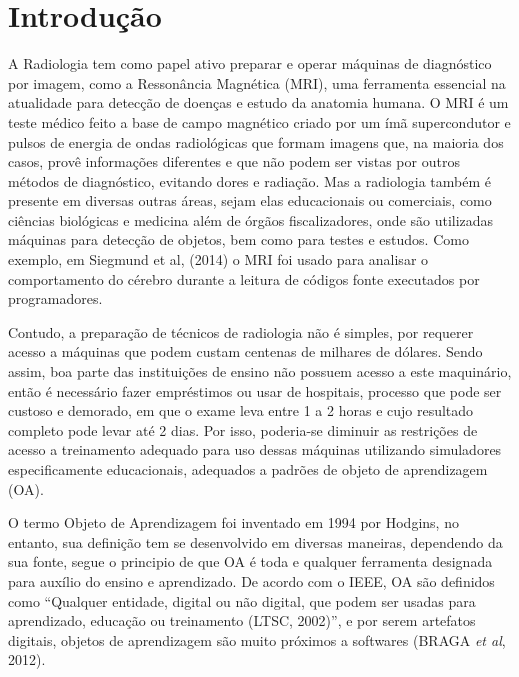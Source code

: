\documentclass[12pt,openright,oneside,a4paper,english,french,spanish,brazil]{unifil}
\begin{document}
\renewcommand{\ABNTEXsectionfont}{\uppercase{\fontfamily{cmr}\fontseries{b}\selectfont}}
\renewcommand{\ABNTEXsectionfontsize}{\large}

\chapter{Introdução}

A Radiologia tem como papel ativo preparar e operar máquinas de diagnóstico por imagem, como a Ressonância Magnética (MRI), uma ferramenta essencial na atualidade para detecção de doenças e estudo da anatomia humana. O MRI é um teste médico feito a base de campo magnético criado por um ímã supercondutor e pulsos de energia de ondas radiológicas que formam imagens que, na maioria dos casos, provê informações diferentes e que não podem ser vistas por outros métodos de diagnóstico, evitando dores e radiação. Mas a radiologia também é presente em diversas outras áreas, sejam elas educacionais ou comerciais, como ciências biológicas e medicina além de órgãos fiscalizadores, onde são utilizadas máquinas para detecção de objetos, bem como para testes e estudos. Como exemplo, em Siegmund et al, (2014) o MRI foi usado para analisar o comportamento do cérebro durante a leitura de códigos fonte executados por programadores. 
\par Contudo, a preparação de técnicos de radiologia não é simples, por requerer acesso a máquinas que podem custam centenas de milhares de dólares. Sendo assim, boa parte das instituições de ensino não possuem acesso a este maquinário, então é necessário fazer empréstimos ou usar de hospitais, processo que pode ser custoso e demorado, em que o exame leva entre 1 a 2 horas e cujo resultado completo pode levar até 2 dias. Por isso, poderia-se diminuir as restrições de acesso a treinamento adequado para uso dessas máquinas utilizando simuladores especificamente educacionais, adequados a padrões de objeto de aprendizagem (OA).
\par O termo Objeto de Aprendizagem foi inventado em 1994 por Hodgins, no entanto, sua definição tem se desenvolvido em diversas maneiras, dependendo da sua fonte, segue o principio de que OA é toda e qualquer ferramenta designada para auxílio do ensino e aprendizado. De acordo com o IEEE, OA são definidos como ``Qualquer entidade, digital ou não digital, que podem ser usadas para aprendizado, educação ou treinamento (LTSC, 2002)'', e por serem artefatos digitais, objetos de aprendizagem são muito próximos a softwares (BRAGA \textit{et al}, 2012).
\end{document}

